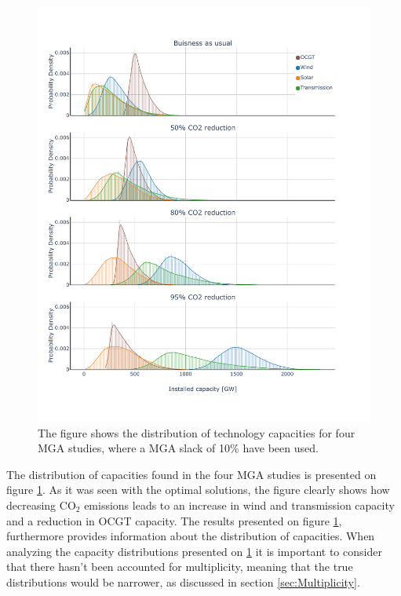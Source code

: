 
\begin{figure}[p]\centerfloat
	\includegraphics[width=1.2\textwidth,trim={0 1.5cm 0 0cm},clip]{./Images/4D_study_histogram}
	\caption{The figure shows the distribution of technology capacities for four MGA studies, where a MGA slack of 10\% have been used.}
	\label{fig:4d_hist}
\end{figure}


The distribution of capacities found in the four MGA studies is presented on figure \ref{fig:4d_hist}. As it was seen with the optimal solutions, the figure clearly shows how decreasing $\text{CO}_2$ emissions leads to an increase in wind and transmission capacity and a reduction in OCGT capacity. The results presented on figure \ref{fig:4d_hist}, furthermore provides information about the distribution of capacities. When analyzing the capacity distributions presented on \ref{fig:4d_hist} it is important to consider that there hasn't been accounted for multiplicity, meaning that the true distributions would be narrower, as discussed in section \ref{sec:Multiplicity}.

